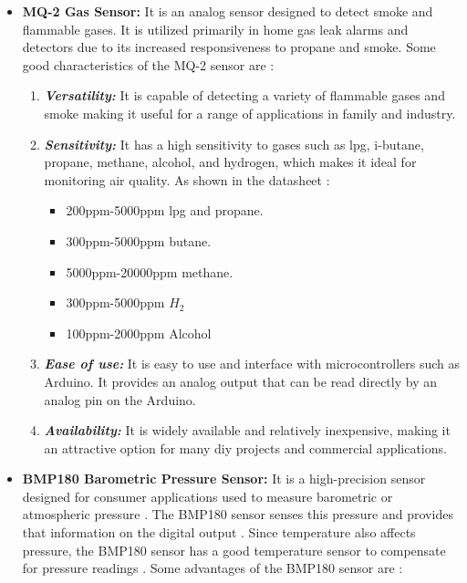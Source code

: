 \begin{itemize}
    \item \textbf{MQ-2 Gas Sensor:} It is an analog sensor designed to detect smoke and flammable gases. It is utilized primarily in home gas leak alarms and detectors due to its increased responsiveness to propane and smoke. Some good characteristics of the MQ-2 sensor are \cite{mq2_datasheet, components101_mq2}:

        \begin{enumerate}
            \item \textbf{\textit{Versatility:}} It is capable of detecting a variety of flammable gases and smoke making it useful for a range of applications in family and industry.

            \item \textbf{\textit{Sensitivity:}} It has a high sensitivity to gases such as \acrfull{lpg}, i-butane, propane, methane, alcohol, and hydrogen, which makes it ideal for monitoring air quality. As shown in the datasheet \cite{mq2_datasheet}:

            \begin{itemize}
                \item 200ppm-5000ppm \acrshort{lpg} and propane.

                \item 300ppm-5000ppm butane.

                \item 5000ppm-20000ppm methane.

                \item 300ppm-5000ppm $H_{2}$

                \item 100ppm-2000ppm Alcohol
            \end{itemize}

            \item \textbf{\textit{Ease of use:}} It is easy to use and interface with microcontrollers such as Arduino. It provides an analog output that can be read directly by an analog pin on the Arduino.

            \item \textbf{\textit{Availability:}} It is widely available and relatively inexpensive, making it an attractive option for many \acrfull{diy} projects and commercial applications.
        \end{enumerate}

    \item \textbf{BMP180 Barometric Pressure Sensor:} It is a high-precision sensor designed for consumer applications used to measure barometric or atmospheric pressure \cite{components101_bmp180}. The BMP180 sensor senses this pressure and provides that information on the digital output \cite{bmp180_datasheet}. Since temperature also affects pressure, the BMP180 sensor has a good temperature sensor to compensate for pressure readings \cite{components101_bmp180}. Some advantages of the BMP180 sensor are \cite{components101_bmp180, bmp180_datasheet}:


\end{itemize}
